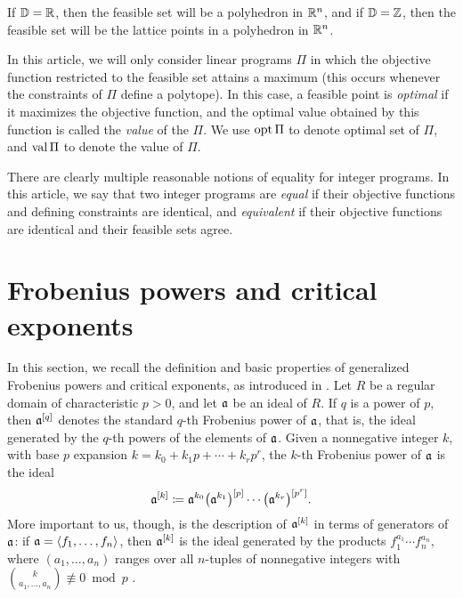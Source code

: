 \documentclass[11pt]{amsart}
\begin{document}
If $\mathbb{D} = \mathbb{R}$, then the feasible set  will be a polyhedron in $\mathbb{R}^n$, and if $\mathbb{D} = \mathbb{Z}$, then the feasible set will be the lattice points in a polyhedron in $\mathbb{R}^n$.  

In this article, we will only consider linear programs $\Pi$ in which the objective function restricted to the feasible set attains a maximum (\eg this occurs whenever the constraints of $\Pi$ define a polytope).
In this case, a feasible point is \emph{optimal} if it maximizes the objective function, and the optimal value obtained by this function is called the \emph{value} of the $\Pi$.
We use $\operatorname{opt} \Pi$ to denote optimal set of $\Pi$, and $\operatorname{val} \Pi$ to denote the value of $\Pi$. 

There are clearly multiple reasonable notions of equality for integer programs.
In this article,  we say that two integer programs are \emph{equal} if their objective functions and defining constraints are identical, and \emph{equivalent} if their objective functions are identical and their feasible sets agree. 



\newpage

\section{Frobenius powers and critical exponents}

In this section, we recall the definition and basic properties of generalized Frobenius powers and critical exponents, as introduced in \cite{hernandez+etal.frobenius_powers}.
Let $R$ be a regular domain of characteristic $p > 0$, and let $\mathfrak{a}$ be an ideal of $R$.
If $q$ is a power of $p$, then $\mathfrak{a}^{[q]}$ denotes the standard $q$-th Frobenius power of $\mathfrak{a}$, that is, the ideal generated by the $q$-th powers of the elements of $\mathfrak{a}$.
Given a nonnegative integer $k$, with base $p$ expansion $k = k_0 + k_1 p + \cdots + k_r p^r$, the $k$-th Frobenius power of $\mathfrak{a}$ is the ideal
\[\mathfrak{a}^{[k]} \coloneqq \mathfrak{a}^{k_0}\big(\mathfrak{a}^{k_1}\big)^{[p]}\cdots \big(\mathfrak{a}^{k_r}\big)^{[p^r]}.\]
More important to us, though, is the description of $\mathfrak{a}^{[k]}$ in terms of generators of $\mathfrak{a}$: if $\mathfrak{a} = \langle f_1,\ldots,f_n \rangle$, then $\mathfrak{a}^{[k]}$ is the ideal generated by the products $f_1^{a_1}\cdots f_n^{a_n}$, where $(a_1,\ldots,a_n)$ ranges over all $n$-tuples of nonnegative integers with $\binom{k}{a_1,\ldots,a_n}\not\equiv 0\bmod{p}$ \cite[Proposition~3.5]{hernandez+etal.frobenius_powers}.
\end{document}
